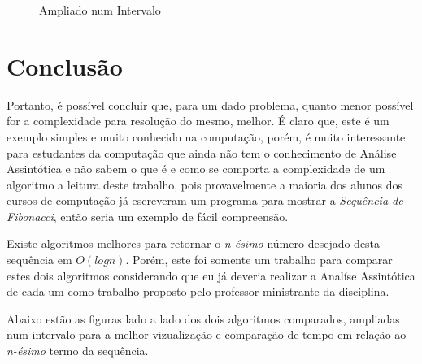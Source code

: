 \documentclass[a4paper, 12pt]{article}
\begin{document}
\begin{figure}[h]
\begin{minipage}[b]{0.45\linewidth}
\caption{Ampliado num Intervalo}
\end{minipage}
\end{figure} 
\newpage

\section{Conclusão}

Portanto, é possível concluir que, para um dado problema, quanto menor possível for a complexidade para resolução do mesmo, melhor. É claro que, este é um exemplo simples e muito conhecido na computação, porém, é muito interessante para estudantes da computação que ainda não tem o conhecimento de Análise Assintótica e não sabem o que é e como se comporta a complexidade de um algoritmo a leitura deste trabalho, pois provavelmente a maioria dos alunos dos cursos de computação já escreveram um programa para mostrar a {\it Sequência de Fibonacci}, então seria um exemplo de fácil compreensão.

Existe algoritmos melhores para retornar o {\it n-ésimo} número desejado desta sequência em $O(logn)$. Porém, este foi somente um trabalho para comparar estes dois algoritmos considerando que eu já deveria realizar a Analíse Assintótica de cada um como trabalho proposto pelo professor ministrante da disciplina. 

Abaixo estão as figuras lado a lado dos dois algoritmos comparados, ampliadas num intervalo para a melhor vizualização e comparação de tempo em relação ao {\it n-ésimo} termo da sequência.
\end{document}
